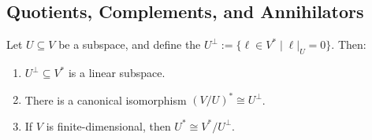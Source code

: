 \subsection{Quotients, Complements, and Annihilators}

\begin{proposition}
  \label{prop:annihilator_dual_quotient}
  Let $U \subseteq V$ be a subspace, and define the  $U^\perp := \{\ell \in V^* \mid \ell|_U = 0\}$. Then:
  \begin{enumerate}
    \item $U^\perp \subseteq V^*$ is a linear subspace.
    \item There is a canonical isomorphism $(V/U)^* \cong U^\perp$.
    \item If $V$ is finite-di\-men\-sional, then $U^* \cong V^*/U^\perp$.
  \end{enumerate}
\end{proposition}

